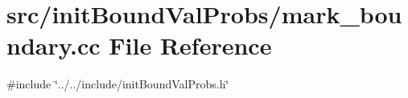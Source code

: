 \section{src/init\+Bound\+Val\+Probs/mark\+\_\+boundary.cc File Reference}
\label{mark__boundary_8cc}
{\ttfamily \#include \char`\"{}../../include/init\+Bound\+Val\+Probs.\+h\char`\"{}}\newline
